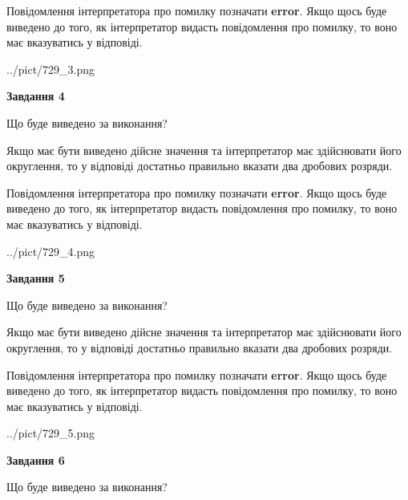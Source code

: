 \documentclass[12pt, ukrainian]{article}
\begin{document}
{\begin {Large}
Повідомлення інтерпретатора про помилку позначати \textbf{error}.
Якщо щось буде виведено до того, як інтерпретатор видасть повідомлення про помилку, 
то воно має вказуватись у відповіді. \par

\begin{center}
	{../pict/729_3.png}
\end{center}
\newpage

{\begin {center}\textbf{Завдання 4}\end {center}}\par
Що буде виведено за виконання? \par

Якщо має бути виведено дійсне значення та інтерпретатор має здійснювати його округлення, 
то у відповіді достатньо правильно вказати два дробових розряди.

Повідомлення інтерпретатора про помилку позначати \textbf{error}.
Якщо щось буде виведено до того, як інтерпретатор видасть повідомлення про помилку, 
то воно має вказуватись у відповіді. \par

\begin{center}
	{../pict/729_4.png}
\end{center}
\newpage

{\begin {center}\textbf{Завдання 5}\end {center}}\par
Що буде виведено за виконання? \par

Якщо має бути виведено дійсне значення та інтерпретатор має здійснювати його округлення, 
то у відповіді достатньо правильно вказати два дробових розряди.

Повідомлення інтерпретатора про помилку позначати \textbf{error}.
Якщо щось буде виведено до того, як інтерпретатор видасть повідомлення про помилку, 
то воно має вказуватись у відповіді. \par

\begin{center}
	{../pict/729_5.png}
\end{center}
\newpage

{\begin {center}\textbf{Завдання 6}\end {center}}\par
Що буде виведено за виконання? \par


\end{Large}}
\end{document}
